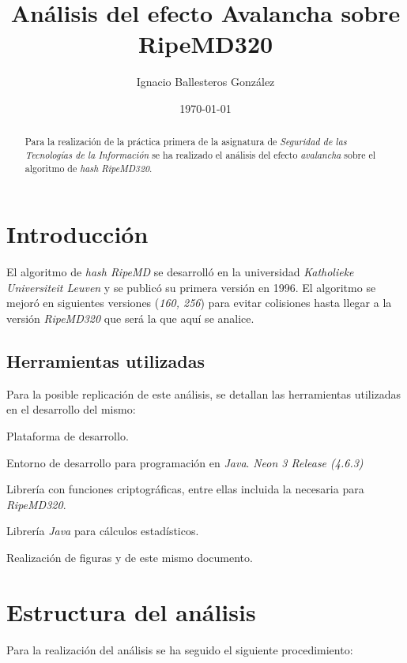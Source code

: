 \documentclass[11pt,a4paper]{article}
\title{Análisis del efecto Avalancha sobre RipeMD320}
\author{Ignacio Ballesteros González}
\date{\today}
\begin{document}
\maketitle
\tableofcontents
\begin{abstract}
  Para la realización de la práctica primera de la asignatura de
  \emph{Seguridad de las Tecnologías de la Información} se ha
  realizado el análisis del efecto \emph{avalancha} sobre el algoritmo de
  \emph{hash} \emph{RipeMD320}.
\end{abstract}

\section{Introducción}
El algoritmo de \emph{hash RipeMD} se desarrolló en la universidad
\emph{Katholieke Universiteit Leuven} y se publicó su primera versión
en 1996. El algoritmo se mejoró en siguientes versiones (\emph{160,
  256}) para evitar colisiones hasta llegar a la versión
\emph{RipeMD320} que será la que aquí se analice.

\subsection{Herramientas utilizadas}

Para la posible replicación de este análisis, se detallan las
herramientas utilizadas en el desarrollo del mismo:

\begin{description}[align=left] %
\item  [Java 1.8] Plataforma de desarrollo.
\item  [Eclipse] Entorno de desarrollo para programación en
  \emph{Java}. \emph{Neon 3 Release (4.6.3)}
\item [Bouncy Castle] Librería con funciones
  criptográficas, entre ellas incluida la necesaria para
  \emph{RipeMD320}.
\item [Apache Commons Math] Librería \emph{Java} para cálculos estadísticos.
\item [\LaTeX] Realización de figuras y de este mismo
  documento.
\end{description}

\section{Estructura del análisis}

Para la realización del análisis se ha seguido el siguiente
procedimiento:
\end{document}

